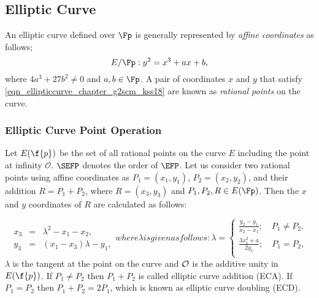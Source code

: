 \subsection{Elliptic Curve}
An elliptic curve \cite{washington2003elliptic} defined over $\Fp$ is generally represented by \textit{affine coordinates} \cite{Silverman} as follows;
\begin{equation}\label{eqn_ellipticcurve_chapter_g2scm_kss18}
E/\Fp : y^2=x^3+ax+b,
\end{equation}
where $ 4a^3+27b^2 \neq 0$ and $a,b \in \Fp$. A pair of coordinates $x$ and $y$ that satisfy \eqref{eqn_ellipticcurve_chapter_g2scm_kss18} are known as \textit{rational points} on the curve. 

\subsubsection{Elliptic Curve Point Operation}
Let $E(\f{p})$ be the set of all rational points on the curve $E$ including the point at infinity $\mathcal{O}$.
$\SEFP$ denotes the order of $\EFP$.
Let us consider two rational points using affine coordinates as $P_1= (x_1, y_1)$, $P_2 = (x_2, y_2)$, and their addition $R = P_1 + P_2$, where $\textit{R} = (x_3, y_3)$ and $P_1, P_2, R \in E(\Fp)$. Then the $x$ and $y$ coordinates of $R$ are calculated as follows:

\begin{subequations}
\begin{eqnarray}\label{eqn_point_add_chapter_g2scm_kss18}
x_3 & = & \lambda^2-x_1-x_2 ,\\
 y_3 & = &(x_1-x_3)\lambda - y_1, 
\end{eqnarray}
where \mbox{$\lambda$} is given as follows:
\begin{equation}\label{eqn_point_solpe_chapter_g2scm_kss18}
\textstyle \lambda = 
\begin{cases}
 \textstyle \frac{y_2 - y_1}{ x_2 -x_1}; \quad \mbox{$P_1 \neq P_2$},\\
 \textstyle \frac{3x_1^2+a}{2y_1}; \quad  \mbox{$P_1 = P_2$},\\
\end{cases}
\end{equation}
\end{subequations}
$\lambda$ is the tangent at the point on the curve and $\cal O$ is the additive unity in $E(\f{p})$. If $P_1 \neq P_2$ then $P_1+P_2$ is called elliptic curve addition (ECA). If $P_1=P_2$ then $P_1+P_2=2P_1$, which is known as elliptic curve doubling (ECD). 

